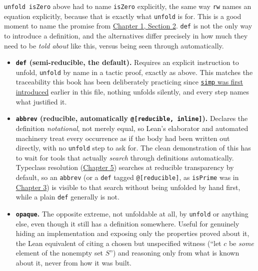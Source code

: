 \texttt{unfold isZero} above had to name \texttt{isZero} explicitly, the same way \texttt{rw} names an equation explicitly, because that is exactly what \texttt{unfold} is for. This is a good moment to name the promise from \hyperref[sec:01-basics:02-def-let-implicit:1]{Chapter 1, Section 2}. \texttt{def} is not the only way to introduce a definition, and the alternatives differ precisely in how much they need to be \emph{told about} like this, versus being seen through automatically.

\begin{itemize}
\tightlist
\item
  \textbf{\texttt{def} (semi-reducible, the default).} Requires an explicit instruction to unfold, \texttt{unfold} by name in a tactic proof, exactly as above. This matches the traceability this book has been deliberately practicing since \protect\hyperlink{simp-simplify-using-known-simplification-lemmas}{\texttt{simp} was first introduced} earlier in this file, nothing unfolds silently, and every step names what justified it.
\item
  \textbf{\texttt{abbrev} (reducible, automatically \texttt{@[reducible, inline]}).} Declares the definition \emph{notational}, not merely equal, so Lean's elaborator and automated machinery treat every occurrence as if the body had been written out directly, with no \texttt{unfold} step to ask for. The clean demonstration of this has to wait for tools that actually \emph{search} through definitions automatically. Typeclass resolution (\hyperref[sec:05-rigor-check:01-structure-vs-class:1]{Chapter 5}) searches at reducible transparency by default, so an \texttt{abbrev} (or a \texttt{def} tagged \texttt{@[reducible]}, as \texttt{isPrime} was in \hyperref[sec:03-propositions-and-proofs:06-quantifiers:1]{Chapter 3}) is visible to that search without being unfolded by hand first, while a plain \texttt{def} generally is not.
\item
  \textbf{\texttt{opaque}.} The opposite extreme, not unfoldable at all, by \texttt{unfold} or anything else, even though it still has a definition somewhere. Useful for genuinely hiding an implementation and exposing only the properties proved about it, the Lean equivalent of citing a chosen but unspecified witness (``let \(c\) be \emph{some} element of the nonempty set \(S\)'') and reasoning only from what is known about it, never from how it was built.
\end{itemize}

